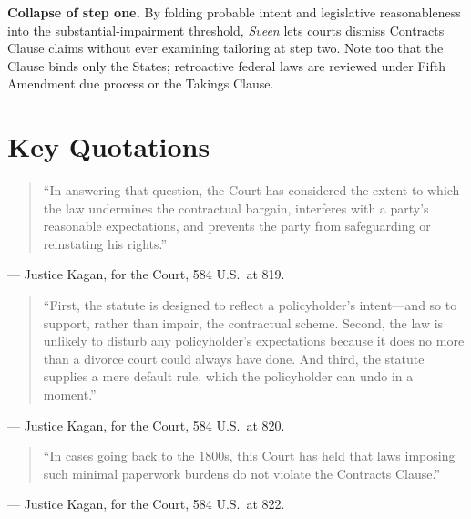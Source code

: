 \documentclass[12pt]{article}
\begin{document}
\textbf{Collapse of step one.} By folding probable intent and legislative reasonableness into the substantial-impairment threshold, \textit{Sveen} lets courts dismiss Contracts Clause claims without ever examining tailoring at step two. Note too that the Clause binds only the States; retroactive federal laws are reviewed under Fifth Amendment due process or the Takings Clause.

\section{Key Quotations}

\begin{quote}
``In answering that question, the Court has considered the extent to which the law undermines the contractual bargain, interferes with a party's reasonable expectations, and prevents the party from safeguarding or reinstating his rights.''
\end{quote}
\noindent --- Justice Kagan, for the Court, 584 U.S.\ at 819.

\begin{quote}
``First, the statute is designed to reflect a policyholder's intent---and so to support, rather than impair, the contractual scheme. Second, the law is unlikely to disturb any policyholder's expectations because it does no more than a divorce court could always have done. And third, the statute supplies a mere default rule, which the policyholder can undo in a moment.''
\end{quote}
\noindent --- Justice Kagan, for the Court, 584 U.S.\ at 820.

\begin{quote}
``In cases going back to the 1800s, this Court has held that laws imposing such minimal paperwork burdens do not violate the Contracts Clause.''
\end{quote}
\noindent --- Justice Kagan, for the Court, 584 U.S.\ at 822.
\end{document}
